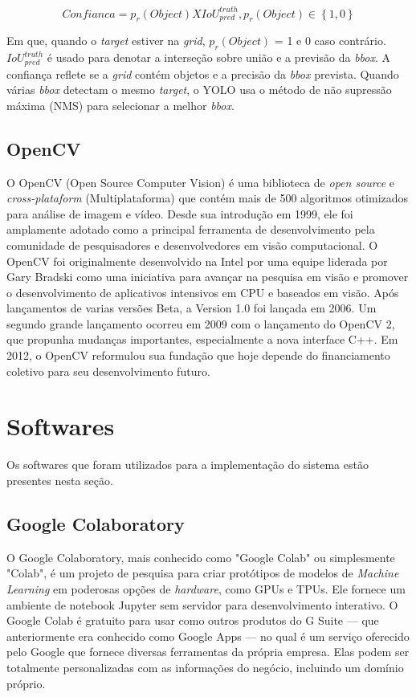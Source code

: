     

\[Confianca = p_r(Object) X IoU_{pred}^{truth} , p_r(Object) \in \left \{ 1\right.,\left.0\right \}\]

Em que, quando o \textit{target} estiver na \textit{grid}, \(p_r(Object)\) = 1 e 0 caso contrário. \(IoU_{pred}^{truth}\) é usado para denotar a interseção sobre união e a previsão da \textit{bbox}. A confiança reflete se a \textit{grid} contém objetos e a precisão da \textit{bbox} prevista. Quando várias \textit{bbox} detectam o mesmo \textit{target}, o YOLO usa o método de não supressão máxima (NMS) para selecionar a melhor \textit{bbox}.

\subsection{OpenCV}

O OpenCV (Open Source Computer Vision) é uma biblioteca de \textit{open source} e \textit{cross-plataform} (Multiplataforma) que contém mais de 500 algoritmos otimizados para análise de imagem e vídeo. Desde sua introdução em 1999, ele foi amplamente adotado como a principal ferramenta de desenvolvimento pela comunidade de pesquisadores e desenvolvedores em visão computacional. O OpenCV foi originalmente desenvolvido na Intel por uma equipe liderada por Gary Bradski como uma iniciativa para avançar na pesquisa em visão e promover o desenvolvimento de aplicativos intensivos em CPU e baseados em visão. Após lançamentos de varias versões Beta,  a Version 1.0 foi lançada em 2006. Um segundo grande lançamento ocorreu em 2009 com o lançamento do OpenCV 2, que propunha mudanças importantes, especialmente a nova interface C++. Em 2012, o OpenCV reformulou sua fundação que hoje depende do financiamento coletivo para seu desenvolvimento futuro. \cite{opencv}

\section{Softwares}
Os softwares que foram utilizados para a implementação do sistema estão presentes nesta seção.
\subsection{Google Colaboratory}
O Google Colaboratory, mais conhecido como "Google Colab" ou simplesmente "Colab", é um projeto de pesquisa para criar protótipos de modelos de \textit{Machine Learning} em poderosas opções de \textit{hardware}, como GPUs e TPUs. Ele fornece um ambiente de notebook Jupyter sem servidor para desenvolvimento interativo. O Google Colab é gratuito para usar como outros produtos do G Suite — que anteriormente era conhecido como Google Apps — no qual é um serviço oferecido pelo Google que fornece diversas ferramentas da própria empresa. Elas podem ser totalmente personalizadas com as informações do negócio, incluindo um domínio próprio.

